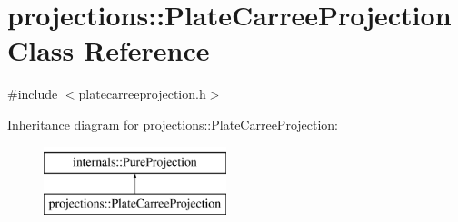 \hypertarget{classprojections_1_1_plate_carree_projection}{\section{projections\-:\-:Plate\-Carree\-Projection Class Reference}
\label{classprojections_1_1_plate_carree_projection}
}


{\ttfamily \#include $<$platecarreeprojection.\-h$>$}

Inheritance diagram for projections\-:\-:Plate\-Carree\-Projection\-:\begin{figure}[H]
\begin{center}
\leavevmode
\includegraphics[height=2.000000cm]{classprojections_1_1_plate_carree_projection}
\end{center}
\end{figure}
